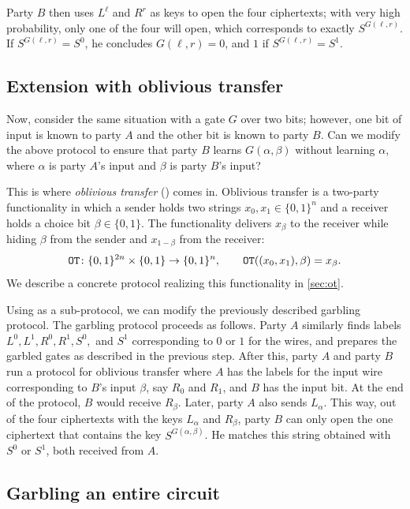 Party $B$ then uses $L^\ell$ and $R^r$ as keys to open the four ciphertexts; with very high probability, only one of the four will open, which corresponds to exactly $S^{G(\ell,r)}$. If $S^{G(\ell,r)} = S^0$, he concludes $G(\ell,r) = 0$, and $1$ if $S^{G(\ell,r)} = S^1$.

\subsection{Extension with oblivious transfer}

Now, consider the same situation with a gate $G$ over two bits; however, one bit of input is known to party $A$ and the other bit is known to party $B$. Can we modify the above protocol to ensure that party $B$ learns $G(\alpha,\beta)$ without learning $\alpha$, where $\alpha$ is party $A$'s input and $\beta$ is party $B$'s input?

This is where \emph{oblivious transfer} (\OT) comes in. Oblivious transfer is a two-party functionality in which a sender holds two strings $x_0,x_1\in\{0,1\}^n$ and a receiver holds a choice bit $\beta\in\{0,1\}$. The functionality delivers $x_\beta$ to the receiver while hiding $\beta$ from the sender and $x_{1-\beta}$ from the receiver:
\[
  \texttt{OT} \colon \{0,1\}^{2n}\times\{0,1\} \to \{0,1\}^n, \qquad \texttt{OT}((x_0,x_1),\beta) = x_\beta.
\]
We describe a concrete protocol realizing this functionality in \cref{sec:ot}.

Using \OT{} as a sub-protocol, we can modify the previously described garbling protocol. The garbling protocol proceeds as follows. Party $A$ similarly finds labels $L^0,L^1,R^0,R^1,S^0,$ and $S^1$ corresponding to $0$ or $1$ for the wires, and prepares the garbled gates as described in the previous step. After this, party $A$ and party $B$ run a protocol for oblivious transfer where $A$ has the labels for the input wire corresponding to $B$'s input $\beta$, say $R_0$ and $R_1$, and $B$ has the input bit. At the end of the \OT{} protocol, $B$ would receive $R_\beta$. Later, party $A$ also sends $L_\alpha$. This way, out of the four ciphertexts with the keys $L_\alpha$ and $R_\beta$, party $B$ can only open the one ciphertext that contains the key $S^{G(\alpha,\beta)}$. He matches this string obtained with $S^0$ or $S^1$, both received from $A$.

\subsection{Garbling an entire circuit}

